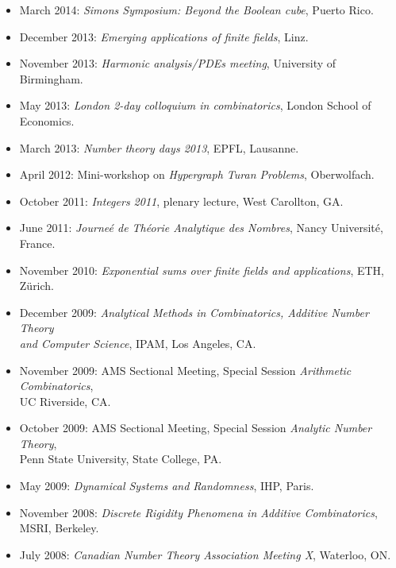 \documentclass[11pt]{article}
\newenvironment{mitemize}{
\begin{itemize}
  \setlength{\itemsep}{1pt}
  \setlength{\parskip}{0pt}
  \setlength{\parsep}{0pt}
}{\end{itemize}}
\begin{document}
\begin{mitemize}
\item March 2014: \textit{Simons Symposium: Beyond the Boolean cube}, Puerto Rico.
\item December 2013: \textit{Emerging applications of finite fields}, Linz.
\item November 2013: \textit{Harmonic analysis/PDEs meeting}, University of Birmingham.
\item May 2013: \textit{London 2-day colloquium in combinatorics}, London School of Economics.
\item March 2013: \textit{Number theory days 2013}, EPFL, Lausanne.
\item April 2012: Mini-workshop on \textit{Hypergraph Turan Problems}, Oberwolfach.
\item October 2011: \textit{Integers 2011}, plenary lecture, West Carollton, GA.
\item June 2011: \textit{Journe\'e de Th\'eorie Analytique des Nombres}, Nancy Universit\'e, France.
\item November 2010: \textit{Exponential sums over finite fields and applications}, ETH, Z\"urich. 
\item December 2009: \textit{Analytical Methods in Combinatorics, Additive Number Theory \\and Computer Science}, IPAM, Los Angeles, CA.
\item November 2009: AMS Sectional Meeting, Special Session \textit{Arithmetic Combinatorics}, \\UC Riverside, CA.
\item October 2009: AMS Sectional Meeting, Special Session \textit{Analytic Number Theory}, \\Penn State University, State College, PA.
\item May 2009: \textit{Dynamical Systems and Randomness}, IHP, Paris.
\item November 2008: \textit{Discrete Rigidity Phenomena in Additive Combinatorics}, MSRI, Berkeley. 
\item July 2008: \textit{Canadian Number Theory Association Meeting X}, Waterloo, ON. 
\end{mitemize}

\end{document}
